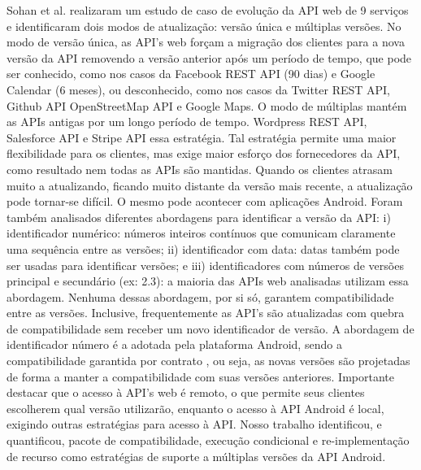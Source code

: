 Sohan et al. \cite{Sohan2015} realizaram um estudo de caso de evolução da API
web de 9 serviços e identificaram dois modos de atualização: versão única e
múltiplas versões. No modo de versão única, as API's web forçam a migração dos
clientes para a nova versão da API removendo a versão anterior após um período
de tempo, que pode ser conhecido, como nos casos da Facebook REST API (90 dias)
e Google Calendar (6 meses), ou desconhecido, como nos casos da Twitter REST API,
Github API OpenStreetMap API e Google Maps. O modo de múltiplas mantém as APIs
antigas por um longo período de tempo. Wordpress REST API, Salesforce API e Stripe
API essa estratégia. Tal estratégia permite uma maior flexibilidade para os clientes,
mas exige maior esforço dos fornecedores da API, como resultado nem todas as APIs são
mantidas. Quando os clientes atrasam muito a atualizando, ficando muito distante da
versão mais recente, a atualização pode tornar-se difícil. O mesmo pode acontecer
com aplicações Android. Foram também analisados diferentes abordagens para identificar
a versão da API: i) identificador numérico: números inteiros contínuos que comunicam
claramente uma sequência entre as versões; ii) identificador com data: datas também
pode ser usadas para identificar versões; e iii) identificadores com números de versões
principal e secundário (ex: 2.3): a maioria das APIs web analisadas utilizam essa
abordagem. Nenhuma dessas abordagem, por si só, garantem compatibilidade entre as versões.
Inclusive, frequentemente as API’s são atualizadas com quebra de compatibilidade sem receber
um novo identificador de versão. A abordagem de identificador número é a adotada pela
plataforma Android, sendo a compatibilidade garantida por contrato \cite{ApiLevels},
ou seja, as novas versões são projetadas de forma a manter a compatibilidade com suas
versões anteriores.   Importante destacar que o acesso à API's web é remoto, o que permite
seus clientes escolherem qual versão utilizarão, enquanto o acesso à API Android é local,
exigindo outras estratégias para acesso à API. Nosso trabalho identificou, e quantificou,
pacote de compatibilidade, execução condicional e re-implementação de recurso como estratégias
de suporte a múltiplas versões da API Android.